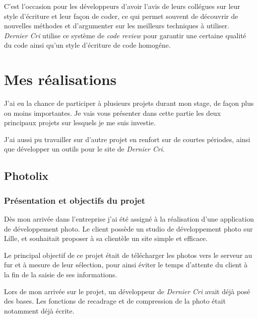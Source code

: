 C'est l'occasion pour les développeurs d'avoir l'avis de leurs collégues
sur leur style d'écriture et leur façon de coder, ce qui permet souvent
de découvrir de nouvelles méthodes et d'argumenter sur les meilleurs
techniques à utiliser. \emph{Dernier Cri} utilise ce système de
\emph{code review} pour garantir une certaine qualité du code ainsi
qu'un style d'écriture de code homogéne.

\newpage

\section{Mes réalisations}\label{mes-ruxe9alisations}

\bigskip

J'ai eu la chance de participer à plusieurs projets durant mon stage, de
façon plus ou moins importantes. Je vais vous présenter dans cette
partie les deux principaux projets sur lesquels je me suis investie.

\bigskip

J'ai aussi pu travailler sur d'autre projet en renfort sur de courtes
périodes, ainsi que développer un outils pour le site de \emph{Dernier
Cri}.

\bigskip

\subsection{Photolix}\label{photolix}

\subsubsection{Présentation et objectifs du
projet}\label{pruxe9sentation-et-objectifs-du-projet}

\bigskip

Dès mon arrivée dans l'entreprise j'ai été assigné à la réalisation
d'une application de développement photo. Le client possède un studio de
développement photo sur Lille, et souhaitait proposer à sa clientèle un
site simple et efficace.

\bigskip

Le principal objectif de ce projet était de télécharger les photos vers
le serveur au fur et à mesure de leur sélection, pour ainsi éviter le
temps d'attente du client à la fin de la saisie de ses informations.

\bigskip

Lors de mon arrivée sur le projet, un développeur de \emph{Dernier Cri}
avait déjà posé des bases. Les fonctions de recadrage et de compression
de la photo était notamment déjà écrite.

